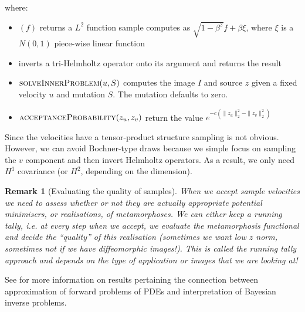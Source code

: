 \documentclass{article}
\newtheorem{remark}{Remark}
\newcommand{\norm}[2]{\| #1 \|_{ #2 }}
\newcommand{\ltwonorm}[1]{\norm{ #1 }{2}}
\begin{document}
where:
\begin{itemize}
\item \mhsample$(f)$ returns a $L^2$ function sample computes as
$\sqrt{1-\beta^2}f + \beta \xi$, where $\xi$ is a $N(0,1)$ piece-wise linear
function
\item \inverthh inverts a tri-Helmholtz operator onto its argument and returns
the result
\item $\textsc{solveInnerProblem}(u,S)$ computes the image $I$ and source $z$
given a fixed velocity $u$ and mutation $S$. The mutation defaults to zero.
\item $\textsc{acceptanceProbability}(z_u, z_v)$ return the value $e^{-c(\ltwonorm{z_u}^2
-\ltwonorm{z_v}^2)}$
\end{itemize}

Since the velocities have a tensor-product structure sampling is not obvious.
However, we can avoid Bochner-type draws because we simple focus on sampling the
$v$ component and then invert Helmholtz operators. As a result, we only need
$H^1$ covariance (or $H^2$, depending on the dimension).

\begin{remark}[Evaluating the quality of samples]
When we accept sample velocities we need to
assess whether or not they are actually appropriate potential minimisers, or
realisations, of metamorphoses. We can either keep a running tally, i.e. at
every step when we accept, we evaluate the metamorphosis functional and decide
the ``quality'' of this realisation (sometimes we want low $z$ norm, sometimes
not if we have diffeomorphic images!). This is called the running tally
approach and depends on the type of application or images that we are looking
at!
\end{remark}

See \cite{cotter2010approximation} for more information on results pertaining
the connection between approximation of forward problems of PDEs and
interpretation of Bayesian inverse problems.



\end{document}
